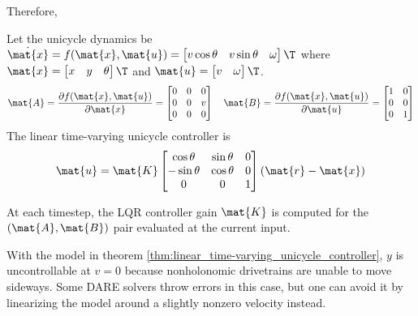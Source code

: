 Therefore,
\begin{theorem}
  \label{thm:linear_time-varying_unicycle_controller}

  Let the unicycle dynamics be
  $\dot{\mat{x}} = f(\mat{x}, \mat{u}) =
  \begin{bmatrix}
    v\cos\theta &
    v\sin\theta &
    \omega
  \end{bmatrix}\T$ where
  $\mat{x} =
  \begin{bmatrix}
    x &
    y &
    \theta
  \end{bmatrix}\T$ and
  $\mat{u} =
  \begin{bmatrix}
    v &
    \omega
  \end{bmatrix}\T$.
  \begin{equation}
    \mat{A} = \frac{\partial f(\mat{x}, \mat{u})}{\partial\mat{x}} =
    \begin{bmatrix}
      0 & 0 & 0 \\
      0 & 0 & v \\
      0 & 0 & 0
    \end{bmatrix}
    \quad
    \mat{B} = \frac{\partial f(\mat{x}, \mat{u})}{\partial\mat{u}} =
    \begin{bmatrix}
      1 & 0 \\
      0 & 0 \\
      0 & 1
    \end{bmatrix}
  \end{equation}
  The linear time-varying unicycle controller is
  \begin{equation}
    \mat{u} = \mat{K}
    \begin{bmatrix}
      \cos\theta & \sin\theta & 0 \\
      -\sin\theta & \cos\theta & 0 \\
      0 & 0 & 1
    \end{bmatrix}
    (\mat{r} - \mat{x})
  \end{equation}

  At each timestep, the LQR controller gain $\mat{K}$ is computed for the
  $(\mat{A}, \mat{B})$ pair evaluated at the current input.
\end{theorem}

With the \gls{model} in theorem
\ref{thm:linear_time-varying_unicycle_controller}, $y$ is uncontrollable at
$v = 0$ because nonholonomic drivetrains are unable to move sideways. Some DARE
solvers throw errors in this case, but one can avoid it by linearizing the model
around a slightly nonzero velocity instead.

